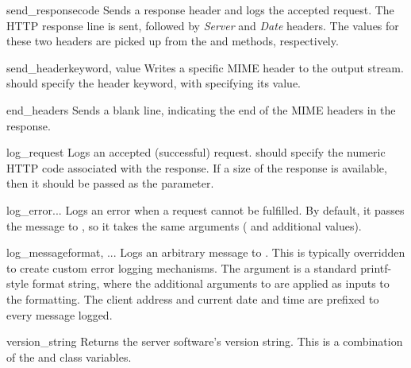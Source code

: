 \begin{methoddesc}{send_response}{code}
Sends a response header and logs the accepted request. The HTTP
response line is sent, followed by \emph{Server} and \emph{Date}
headers. The values for these two headers are picked up from the
 and  methods,
respectively.
\end{methoddesc}

\begin{methoddesc}{send_header}{keyword, value}
Writes a specific MIME header to the output stream. 
should specify the header keyword, with  specifying
its value.
\end{methoddesc}

\begin{methoddesc}{end_headers}{}
Sends a blank line, indicating the end of the MIME headers in
the response.
\end{methoddesc}

\begin{methoddesc}{log_request}{}
Logs an accepted (successful) request.  should specify
the numeric HTTP code associated with the response. If a size of
the response is available, then it should be passed as the
 parameter.
\end{methoddesc}

\begin{methoddesc}{log_error}{...}
Logs an error when a request cannot be fulfilled. By default,
it passes the message to , so it takes the
same arguments ( and additional values).
\end{methoddesc}

\begin{methoddesc}{log_message}{format, ...}
Logs an arbitrary message to . This is typically
overridden to create custom error logging mechanisms. The
 argument is a standard printf-style format string,
where the additional arguments to  are applied
as inputs to the formatting. The client address and current date
and time are prefixed to every message logged.
\end{methoddesc}

\begin{methoddesc}{version_string}{}
Returns the server software's version string. This is a combination
of the  and  class variables.
\end{methoddesc}


